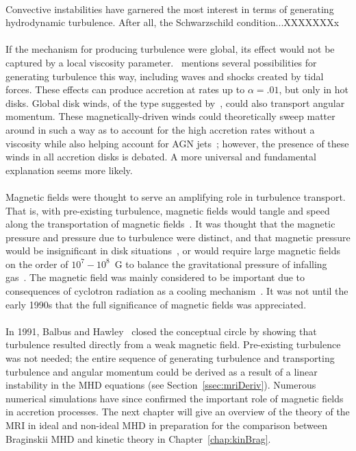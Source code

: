\\
Convective instabilities have garnered the most interest in terms of generating hydrodynamic turbulence. After all, the Schwarzschild condition...XXXXXXXx\\
\\
If the mechanism for producing turbulence were global, its effect would not be captured by a local viscosity parameter.~\cite{Spruit2009} mentions several possibilities for generating turbulence this way, including waves and shocks created by tidal forces. These effects can produce accretion at rates up to $\alpha=.01$, but only in hot disks. Global disk winds, of the type suggested by~\citet{Blandford1976}, could also transport angular momentum. These magnetically-driven winds could theoretically sweep matter around in such a way as to account for the high accretion rates without a viscosity while also helping account for AGN jets~\cite{Koenigl1989}; however, the presence of these winds in all accretion disks is debated. A more universal and fundamental explanation seems more likely.\\
\\
Magnetic fields were thought to serve an amplifying role in turbulence transport. That is, with pre-existing turbulence, magnetic fields would tangle and speed along the transportation of magnetic fields~\cite{ShakuraSunyaev1973}. It was thought that the magnetic pressure and pressure due to turbulence were distinct, and that magnetic pressure would be insignificant in disk situations~\cite{LyndenBell1969}, or would require large magnetic fields on the order of $10^7-10^8$~G to balance the gravitational pressure of infalling gas~\cite{TrevesAl1988}. The magnetic field was mainly considered to be important due to consequences of cyclotron radiation as a cooling mechanism~\cite{Shapiro1973}. It was not until the early 1990s that the full significance of magnetic fields was appreciated.\\
\\
In 1991, Balbus and Hawley~\cite{BalbusHawley1991a,BalbusHawley1991b} closed the conceptual circle by showing that turbulence resulted directly from a weak magnetic field. Pre-existing turbulence was not needed; the entire sequence of generating turbulence and transporting turbulence and angular momentum could be derived as a result of a linear instability in the MHD equations (see Section~\ref{ssec:mriDeriv}). Numerous numerical simulations have since confirmed the important role of magnetic fields in accretion processes. The next chapter will give an overview of the theory of the MRI in ideal and non-ideal MHD in preparation for the comparison between Braginskii MHD and kinetic theory in Chapter~\ref{chap:kinBrag}.


